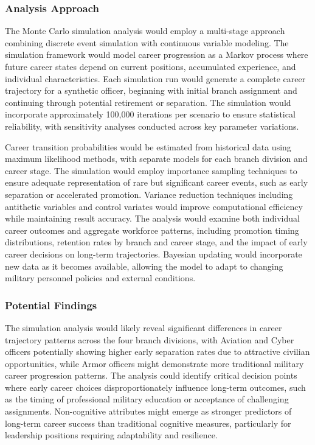 \documentclass[main.tex]{subfiles}
\begin{document}
\subsubsection{Analysis Approach}

The Monte Carlo simulation analysis would employ a multi-stage approach combining discrete event simulation with continuous variable modeling. The simulation framework would model career progression as a Markov process where future career states depend on current positions, accumulated experience, and individual characteristics. Each simulation run would generate a complete career trajectory for a synthetic officer, beginning with initial branch assignment and continuing through potential retirement or separation. The simulation would incorporate approximately 100,000 iterations per scenario to ensure statistical reliability, with sensitivity analyses conducted across key parameter variations.

Career transition probabilities would be estimated from historical data using maximum likelihood methods, with separate models for each branch division and career stage. The simulation would employ importance sampling techniques to ensure adequate representation of rare but significant career events, such as early separation or accelerated promotion. Variance reduction techniques including antithetic variables and control variates would improve computational efficiency while maintaining result accuracy. The analysis would examine both individual career outcomes and aggregate workforce patterns, including promotion timing distributions, retention rates by branch and career stage, and the impact of early career decisions on long-term trajectories. Bayesian updating would incorporate new data as it becomes available, allowing the model to adapt to changing military personnel policies and external conditions.

\subsubsection{Potential Findings}

The simulation analysis would likely reveal significant differences in career trajectory patterns across the four branch divisions, with Aviation and Cyber officers potentially showing higher early separation rates due to attractive civilian opportunities, while Armor officers might demonstrate more traditional military career progression patterns. The analysis could identify critical decision points where early career choices disproportionately influence long-term outcomes, such as the timing of professional military education or acceptance of challenging assignments. Non-cognitive attributes might emerge as stronger predictors of long-term career success than traditional cognitive measures, particularly for leadership positions requiring adaptability and resilience.
\end{document}

